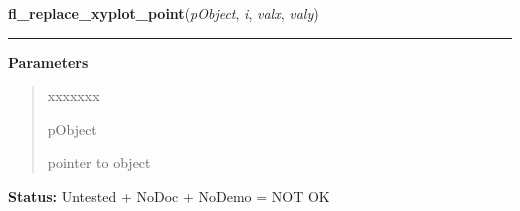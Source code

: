     \label{xformslib:library:fl_replace_xyplot_point}

    \vspace{0.5ex}

\hspace{.8\funcindent}\begin{boxedminipage}{\funcwidth}

    \raggedright \textbf{fl\_replace\_xyplot\_point}(\textit{pObject}, \textit{i}, \textit{valx}, \textit{valy})

    \vspace{-1.5ex}

    \rule{\textwidth}{0.5\fboxrule}
\setlength{\parskip}{2ex}
\setlength{\parskip}{1ex}
      \textbf{Parameters}
      \vspace{-1ex}

      \begin{quote}
        \begin{Ventry}{xxxxxxx}

          \item[pObject]

          pointer to object

        \end{Ventry}

      \end{quote}

\textbf{Status:} Untested + NoDoc + NoDemo = NOT OK



    \end{boxedminipage}

    \label{xformslib:library:fl_replace_xyplot_point_in_overlay}

    \vspace{0.5ex}

